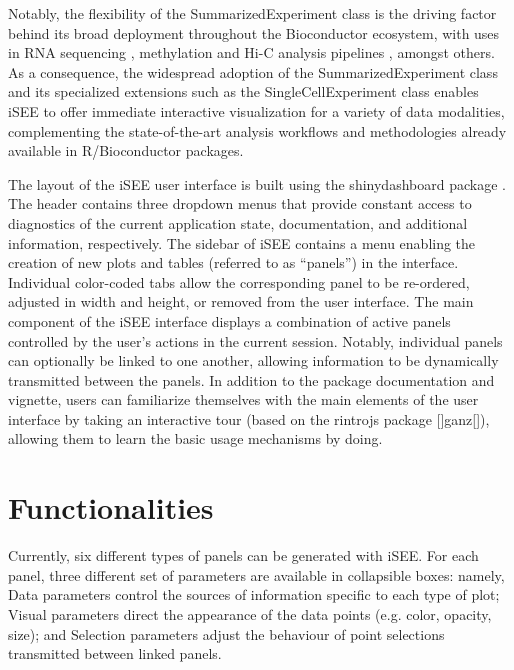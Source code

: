 \documentclass[10pt,a4paper,twocolumn]{article}
\begin{document}
Notably, the flexibility of the SummarizedExperiment class is the driving factor behind its broad deployment throughout the Bioconductor ecosystem, with uses in RNA sequencing \citep{love2014moderated}, methylation \citep{aryee2014minfi} and Hi-C analysis pipelines \citep{lun2016infrastructure}, amongst others.
As a consequence, the widespread adoption of the SummarizedExperiment class and its specialized extensions such as the SingleCellExperiment class enables iSEE to offer immediate interactive visualization for a variety of data modalities, complementing the state-of-the-art analysis workflows and methodologies already available in R/Bioconductor packages.

The layout of the iSEE user interface is built using the shinydashboard package \citep{chang2018shinydashboard}.
The header contains three dropdown menus that provide constant access to diagnostics of the current application state, documentation, and additional information, respectively. %
The sidebar of iSEE contains a menu enabling the creation of new plots and tables (referred to as ``panels'') in the interface.
Individual color-coded tabs allow the corresponding panel to be re-ordered, adjusted in width and height, or removed from the user interface.
The main component of the iSEE interface displays a combination of active panels controlled by the user's actions in the current session.
Notably, individual panels can optionally be linked to one another, allowing information to be dynamically transmitted between the panels.
In addition to the package documentation and vignette, users can familiarize themselves with the main elements of the user interface by taking an interactive tour (based on the rintrojs package []ganz[]), allowing them to learn the basic usage mechanisms by doing.


\section*{Functionalities}
Currently, six different types of panels can be generated with iSEE. For each panel, three different set of parameters are available in collapsible boxes: namely, Data parameters control the sources of information specific to each type of plot; Visual parameters direct the appearance of the data points (e.g. color, opacity, size); and Selection parameters adjust the behaviour of point selections transmitted between linked panels.
\end{document}
